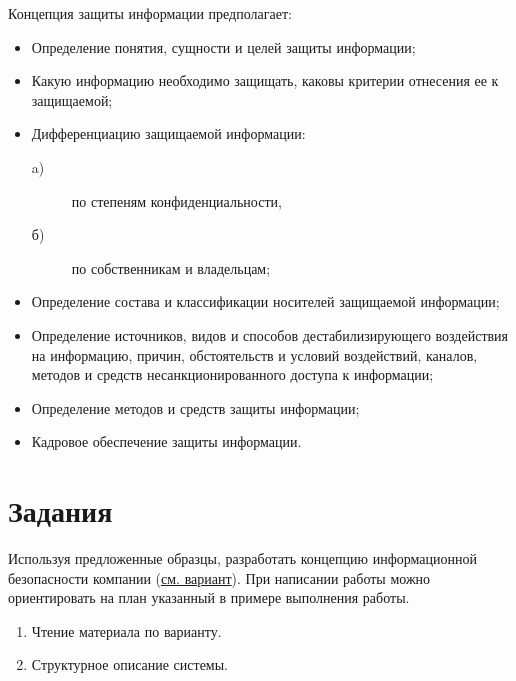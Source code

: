 Концепция защиты информации предполагает:
\begin{itemize}
  \item Определение понятия, сущности и целей защиты информации;
  \item Какую информацию необходимо защищать, каковы критерии отнесения ее к защищаемой;
  \item Дифференциацию защищаемой информации:
  \begin{description}
    \item[a)] по степеням конфиденциальности,
    \item[б)] по собственникам и владельцам;
  \end{description}
  \item Определение состава и классификации носителей защищаемой
      информации;
  \item Определение источников, видов и способов дестабилизирующего
      воздействия на информацию, причин, обстоятельств и условий
      воздействий, каналов, методов и средств несанкционированного доступа
      к информации;
  \item Определение методов и средств защиты информации;
  \item Кадровое обеспечение защиты информации.
\end{itemize}



\section{Задания}\label{sect3_b}
%
Используя предложенные образцы, разработать концепцию информационной
безопасности компании (\hyperref[var_PR1]{см. вариант}). При написании работы
можно ориентировать на план указанный в примере выполнения работы.

\begin{enumerate}
  \item Чтение материала по варианту.
  \item Структурное описание системы.
\end{enumerate}

